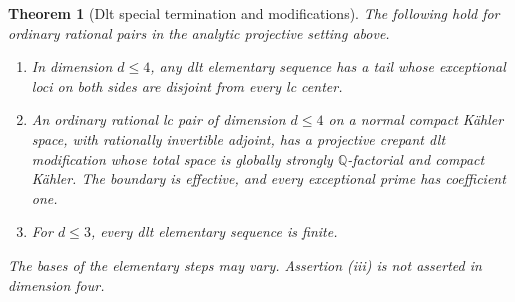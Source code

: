 \documentclass[11pt,letterpaper]{article}
\newtheorem{theorem}{Theorem}[section]
\theoremstyle{definition}
\theoremstyle{remark}
\begin{document}
\begin{theorem}[Dlt special termination and modifications]
\label{bir:special-termination}
The following hold for ordinary rational pairs in the analytic
projective setting above.
\begin{enumerate}[label=\textup{(\roman*)}]
\item In dimension $d\leq4$, any dlt elementary sequence has a tail
whose exceptional loci on both sides are disjoint from every lc
center.
\item An ordinary rational lc pair of dimension $d\leq4$ on a
normal compact K\"ahler space, with rationally invertible adjoint,
has a projective crepant dlt modification whose total space is
globally strongly $\mathbb{Q}$-factorial and compact K\"ahler.  The boundary
is effective, and every exceptional prime has coefficient one.
\item For $d\leq3$, every dlt elementary sequence is finite.
\end{enumerate}
The bases of the elementary steps may vary.  Assertion \textup{(iii)}
is not asserted in dimension four.
\end{theorem}
\end{document}
